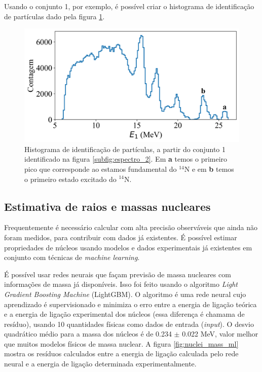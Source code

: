 \documentclass[a4paper,12pt,oneside]{book}
\begin{document}
\par Usando o conjunto 1, por exemplo, é possível criar o histograma de identificação de partículas dado pela figura \ref{fig:PID_hist}.

\begin{figure}
    \centering
    \includegraphics[scale=0.11]{figs/espectro_3.png}
    \caption{Histograma de identificação de partículas, a partir do conjunto 1 identificado na figura \ref{subfig:espectro_2}. Em \textbf{a} temos o primeiro pico que corresponde ao estamos fundamental do $^{14}$N e em \textbf{b} temos o primeiro estado excitado do $^{14}$N.}
    \label{fig:PID_hist}
\end{figure}

\subsection{Estimativa de raios e massas nucleares}

\par Frequentemente é necessário calcular com alta precisão observáveis que ainda não foram medidos, para contribuir com dados já existentes. É possível estimar propriedades de núcleos usando modelos e dados experimentais já existentes em conjunto com técnicas de \textit{machine learning}.

\par É possível usar redes neurais que façam previsão de massa nucleares com informações de massa já disponíveis. Isso foi feito usando o algoritmo \textit{Light Gradient Boosting Machine} (LightGBM)\cite{LightGBM}. O algoritmo é uma rede neural cujo aprendizado é supervisionado e minimiza o erro entre a energia de ligação teórica e a energia de ligação experimental dos núcleos (essa diferença é chamama de resíduo), usando 10 quantidades físicas como dados de entrada (\textit{input})\cite{nuclear_mass}. O desvio quadrático médio para a massa dos núcleos é de 0.234 $\pm$ 0.022 MeV, valor melhor que muitos modelos físicos de massa nuclear. A figura \ref{fig:nuclei_mass_ml} mostra os resíduos calculados entre a energia de ligação calculada pelo rede neural e a energia de ligação determinada experimentalmente.
\end{document}
